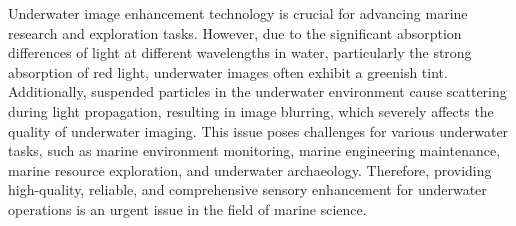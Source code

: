 \begin{abstract*}
  Underwater image enhancement technology is crucial for advancing marine research and exploration tasks. However, due to the significant absorption differences of light at different wavelengths in water, particularly the strong absorption of red light, underwater images often exhibit a greenish tint. Additionally, suspended particles in the underwater environment cause scattering during light propagation, resulting in image blurring, which severely affects the quality of underwater imaging. This issue poses challenges for various underwater tasks, such as marine environment monitoring, marine engineering maintenance, marine resource exploration, and underwater archaeology. Therefore, providing high-quality, reliable, and comprehensive sensory enhancement for underwater operations is an urgent issue in the field of marine science.


\end{abstract*}
